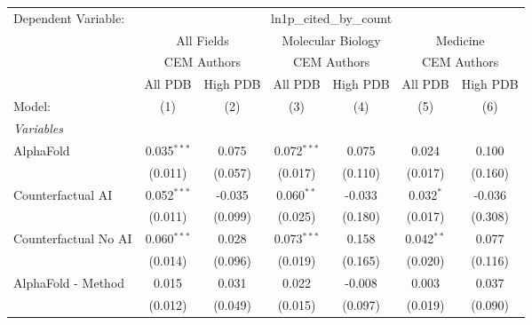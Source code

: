 \begingroup
\centering
\begin{tabular}{lcccccc}
   \tabularnewline \midrule \midrule
   Dependent Variable: & \multicolumn{6}{c}{ln1p\_cited\_by\_count}\\
 & \multicolumn{2}{c}{All Fields} & \multicolumn{2}{c}{Molecular Biology} & \multicolumn{2}{c}{Medicine} \\
\cmidrule(lr){2-3} \cmidrule(lr){4-5} \cmidrule(lr){6-7}
 & \multicolumn{2}{c}{CEM Authors} & \multicolumn{2}{c}{CEM Authors} & \multicolumn{2}{c}{CEM Authors} \\
\cmidrule(lr){2-3} \cmidrule(lr){4-5} \cmidrule(lr){6-7}
 & \multicolumn{1}{c}{All PDB} & \multicolumn{1}{c}{High PDB} & \multicolumn{1}{c}{All PDB} & \multicolumn{1}{c}{High PDB} & \multicolumn{1}{c}{All PDB} & \multicolumn{1}{c}{High PDB} \\
\cmidrule(lr){2-2} \cmidrule(lr){3-3} \cmidrule(lr){4-4} \cmidrule(lr){5-5} \cmidrule(lr){6-6} \cmidrule(lr){7-7}
   Model:                                                     & (1)            & (2)           & (3)            & (4)     & (5)            & (6)\\  
   \midrule
   \emph{Variables}\\
   AlphaFold                                                  & 0.035$^{***}$  & 0.075         & 0.072$^{***}$  & 0.075   & 0.024          & 0.100\\   
                                                              & (0.011)        & (0.057)       & (0.017)        & (0.110) & (0.017)        & (0.160)\\   
   Counterfactual AI                                          & 0.052$^{***}$  & -0.035        & 0.060$^{**}$   & -0.033  & 0.032$^{*}$    & -0.036\\   
                                                              & (0.011)        & (0.099)       & (0.025)        & (0.180) & (0.017)        & (0.308)\\   
   Counterfactual No AI                                       & 0.060$^{***}$  & 0.028         & 0.073$^{***}$  & 0.158   & 0.042$^{**}$   & 0.077\\   
                                                              & (0.014)        & (0.096)       & (0.019)        & (0.165) & (0.020)        & (0.116)\\   
   AlphaFold - Method                                         & 0.015          & 0.031         & 0.022          & -0.008  & 0.003          & 0.037\\   
                                                              & (0.012)        & (0.049)       & (0.015)        & (0.097) & (0.019)        & (0.090)\\   

\end{tabular}
